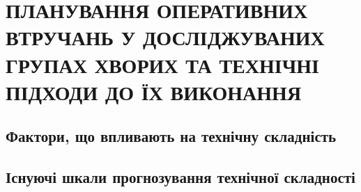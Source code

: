 \chapter{ПЛАНУВАННЯ ОПЕРАТИВНИХ ВТРУЧАНЬ У ДОСЛІДЖУВАНИХ ГРУПАХ ХВОРИХ ТА ТЕХНІЧНІ ПІДХОДИ ДО ЇХ ВИКОНАННЯ}
\section{Фактори, що впливають на технічну складність}
\section{Існуючі шкали прогнозування технічної складності}